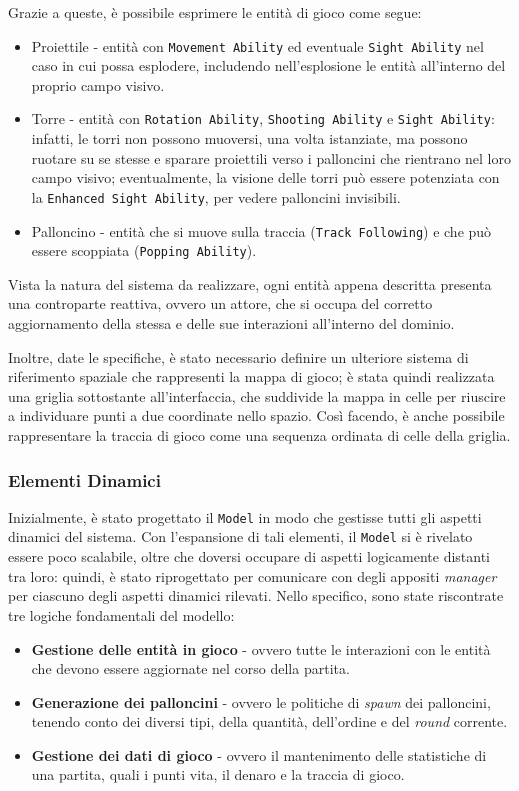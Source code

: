 Grazie a queste, è possibile esprimere le entità di gioco come segue:
\begin{itemize}
    \item Proiettile - entità con \texttt{Movement Ability} ed eventuale \texttt{Sight Ability} nel caso in cui possa
    esplodere, includendo nell'esplosione le entità all'interno del proprio campo visivo.
    \item Torre - entità con \texttt{Rotation Ability}, \texttt{Shooting Ability} e \texttt{Sight Ability}: infatti, le
    torri non possono muoversi, una volta istanziate, ma possono ruotare su se stesse e sparare proiettili verso i
    palloncini che rientrano nel loro campo visivo; eventualmente, la visione delle torri può essere potenziata con la
    \texttt{Enhanced Sight Ability}, per vedere palloncini invisibili.
    \item Palloncino - entità che si muove sulla traccia (\texttt{Track Following}) e che può essere scoppiata
    (\texttt{Popping Ability}).
\end{itemize}
Vista la natura del sistema da realizzare, ogni entità appena descritta presenta una controparte reattiva, ovvero un
attore, che si occupa del corretto aggiornamento della stessa e delle sue interazioni all'interno del dominio.

Inoltre, date le specifiche, è stato necessario definire un ulteriore sistema di riferimento spaziale che rappresenti la
mappa di gioco; è stata quindi realizzata una griglia sottostante all'interfaccia, che suddivide la mappa in celle per
riuscire a individuare punti a due coordinate nello spazio. Così facendo, è anche possibile rappresentare la traccia di
gioco come una sequenza ordinata di celle della griglia.

\subsubsection{Elementi Dinamici}
Inizialmente, è stato progettato il \texttt{Model} in modo che gestisse tutti gli aspetti dinamici del sistema.
Con l'espansione di tali elementi, il \texttt{Model} si è rivelato essere poco scalabile, oltre che doversi occupare di
aspetti logicamente distanti tra loro: quindi, è stato riprogettato per comunicare con degli appositi \textit{manager}
per ciascuno degli aspetti dinamici rilevati. Nello specifico, sono state riscontrate tre logiche fondamentali del
modello:
\begin{itemize}
    \item \textbf{Gestione delle entità in gioco} - ovvero tutte le interazioni con le entità che devono essere
    aggiornate nel corso della partita.
    \item \textbf{Generazione dei palloncini} - ovvero le politiche di \textit{spawn} dei palloncini, tenendo conto dei
    diversi tipi, della quantità, dell'ordine e del \textit{round} corrente.
    \item \textbf{Gestione dei dati di gioco} - ovvero il mantenimento delle statistiche di una partita, quali i punti
    vita, il denaro e la traccia di gioco.
\end{itemize}

